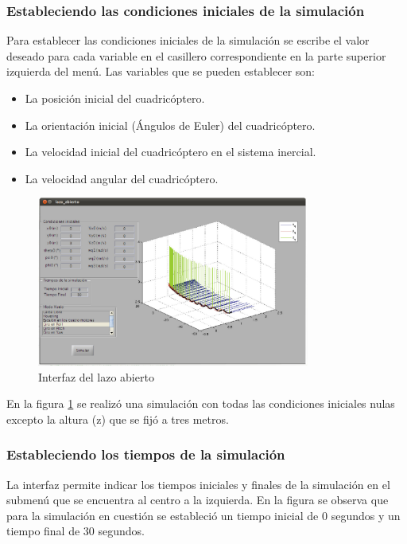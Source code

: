 \documentclass[main]{subfiles}
\begin{document}
\subsubsection*{Estableciendo las condiciones iniciales de la simulaci\'on}
Para establecer las condiciones iniciales de la simulaci\'on se escribe el valor deseado para cada variable en el casillero correspondiente en la parte superior izquierda del men\'u. Las variables que se pueden establecer son:
\begin{itemize}
\item La posici\'on inicial del cuadric\'optero.
\item La orientaci\'on inicial (\'Angulos de Euler) del cuadric\'optero.
\item La velocidad inicial del cuadric\'optero en el sistema inercial.
\item La velocidad angular del cuadric\'optero.
\end{itemize}
\begin{figure}
\centering
  \includegraphics[width=0.8\textwidth]{./pics_anexo_simulador/anexo:lazo_abierto.pdf}
\caption{Interfaz del lazo abierto}
\vspace{-20pt}
\label{fig:anexo:lazo_abierto}
\end{figure}

En la figura \ref{fig:anexo:lazo_abierto} se realiz\'o una simulaci\'on con todas las condiciones iniciales nulas excepto la altura (z) que se fij\'o a tres metros.
\subsubsection*{Estableciendo los tiempos de la simulaci\'on}
La interfaz permite indicar los tiempos iniciales y finales de la simulaci\'on en el submen\'u que se encuentra al centro a la izquierda. En la figura se observa que para la simulaci\'on en cuesti\'on se estableci\'o un tiempo inicial de 0 segundos y un tiempo final de 30 segundos.
\end{document}
